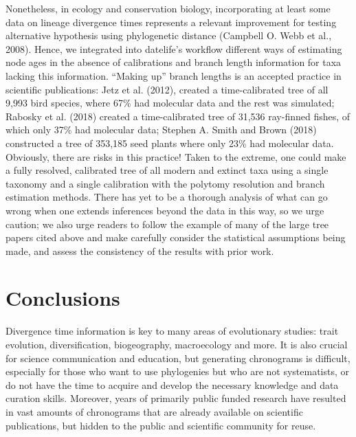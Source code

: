 \documentclass[
  english,
  man]{apa6}
\begin{document}
Nonetheless, in ecology and conservation biology, incorporating at least some data on lineage divergence times represents a relevant improvement for testing alternative hypothesis using phylogenetic distance (Campbell O. Webb et al., 2008).
Hence, we integrated into datelife's workflow different ways of estimating node ages in the absence of calibrations and branch length information for taxa lacking this information.
``Making up'' branch lengths is an accepted practice in scientific publications: Jetz et al. (2012), created a time-calibrated tree of all 9,993 bird species, where 67\% had molecular data and the rest was simulated; Rabosky et al. (2018) created a time-calibrated tree of 31,536 ray-finned fishes, of which only 37\% had molecular data; Stephen A. Smith and Brown (2018) constructed a tree of 353,185 seed plants where only 23\% had molecular data.
Obviously, there are risks in this practice!
Taken to the extreme, one could make a fully resolved, calibrated tree of all modern and extinct taxa using a single taxonomy and a single calibration with the polytomy resolution and branch estimation methods.
There has yet to be a thorough analysis of what can go wrong when one extends inferences beyond the data in this way, so we urge caution; we also urge readers to follow the example of many of the large tree papers cited above and make carefully consider the statistical assumptions being made, and assess the consistency of the results with prior work.

\hypertarget{conclusions}{%
\section{Conclusions}\label{conclusions}}

Divergence time information is key to many areas of evolutionary studies: trait evolution,
diversification, biogeography, macroecology and more. It is also crucial for science communication and education, but generating chronograms is difficult,
especially for those who want to use phylogenies but who are not systematists, or
do not have the time to acquire and develop the necessary knowledge and data curation skills. Moreover, years of primarily public funded research have resulted in vast amounts of chronograms that are already available on scientific publications, but hidden to the public and scientific community for reuse.
\end{document}
